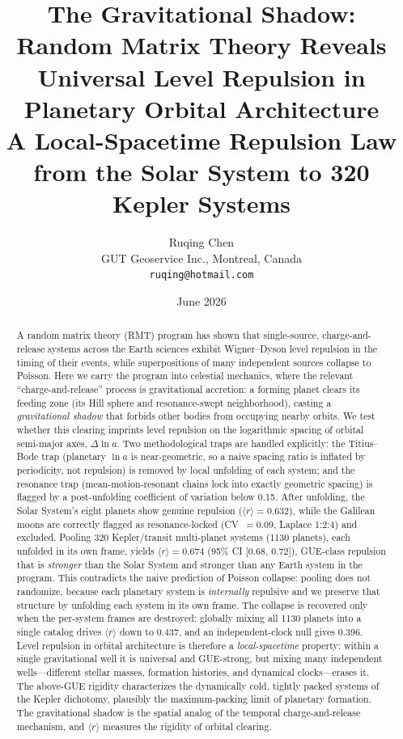 \documentclass[12pt,a4paper]{article}
\title{\textbf{The Gravitational Shadow: Random Matrix Theory Reveals Universal Level Repulsion in Planetary Orbital Architecture}\\[0.4em]
\large A Local-Spacetime Repulsion Law from the Solar System to 320 Kepler Systems}
\author{Ruqing Chen\\ GUT Geoservice Inc., Montreal, Canada\\ \texttt{ruqing@hotmail.com}}
\date{June 2026}
\begin{document}
\maketitle

\begin{abstract}
\noindent A random matrix theory (RMT) program has shown that single-source, charge-and-release systems across the Earth sciences exhibit Wigner--Dyson level repulsion in the timing of their events, while superpositions of many independent sources collapse to Poisson. Here we carry the program into celestial mechanics, where the relevant ``charge-and-release'' process is gravitational accretion: a forming planet clears its feeding zone (its Hill sphere and resonance-swept neighborhood), casting a \emph{gravitational shadow} that forbids other bodies from occupying nearby orbits. We test whether this clearing imprints level repulsion on the logarithmic spacing of orbital semi-major axes, $\Delta\ln a$. Two methodological traps are handled explicitly: the Titius--Bode trap (planetary $\ln a$ is near-geometric, so a naive spacing ratio is inflated by periodicity, not repulsion) is removed by local unfolding of each system; and the resonance trap (mean-motion-resonant chains lock into exactly geometric spacing) is flagged by a post-unfolding coefficient of variation below 0.15. After unfolding, the Solar System's eight planets show genuine repulsion ($\langle r\rangle=0.632$), while the Galilean moons are correctly flagged as resonance-locked (CV~$=0.09$, Laplace 1:2:4) and excluded. Pooling 320 Kepler/transit multi-planet systems (1130 planets), each unfolded in its own frame, yields $\langle r\rangle=0.674$ (95\% CI [0.68, 0.72]), GUE-class repulsion that is \emph{stronger} than the Solar System and stronger than any Earth system in the program. This contradicts the naive prediction of Poisson collapse: pooling does not randomize, because each planetary system is \emph{internally} repulsive and we preserve that structure by unfolding each system in its own frame. The collapse is recovered only when the per-system frames are destroyed: globally mixing all 1130 planets into a single catalog drives $\langle r\rangle$ down to 0.437, and an independent-clock null gives 0.396. Level repulsion in orbital architecture is therefore a \emph{local-spacetime} property: within a single gravitational well it is universal and GUE-strong, but mixing many independent wells---different stellar masses, formation histories, and dynamical clocks---erases it. The above-GUE rigidity characterizes the dynamically cold, tightly packed systems of the Kepler dichotomy, plausibly the maximum-packing limit of planetary formation. The gravitational shadow is the spatial analog of the temporal charge-and-release mechanism, and $\langle r\rangle$ measures the rigidity of orbital clearing.


\end{abstract}
\end{document}
